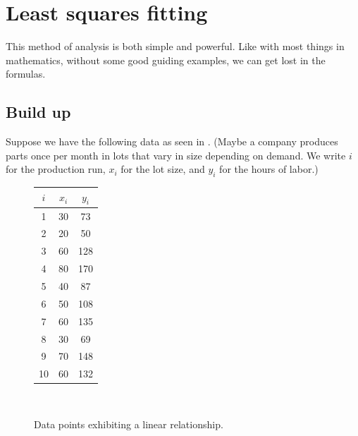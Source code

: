 \documentclass[a4paper, 12pt]{article}
\numberwithin{equation}{section}
\numberwithin{figure}{section}
\theoremstyle{definition}
\begin{document}
\section{Least squares fitting}

This method of analysis is both simple and powerful. Like with most things in
mathematics, without some good guiding examples, we can get lost in the
formulas.

\subsection{Build up}\label{sec:build-up}

Suppose we have the following data as seen in . (Maybe
a company produces parts once per month in lots that vary in size depending on
demand. We write $i$ for the production run, $x_i$ for the lot size, and $y_i$
for the hours of labor.) 

\begin{figure}[h]
	\centering
	\begin{minipage}{0.33\textwidth}
		\centering
		\begin{tabular}{ccc}
			$i$ & $x_i$ & $y_i$ \\ \hline 
			1 & 30 & 73 \\ 
			2 & 20 & 50 \\
			3 & 60 & 128 \\
			4 & 80 & 170 \\
			5 & 40 & 87 \\
			6 & 50 & 108 \\
			7 & 60 & 135 \\
			8 & 30 & 69 \\
			9 & 70 & 148 \\
			10 & 60 & 132 
		\end{tabular}
	\end{minipage}~%
	\begin{minipage}{0.60\textwidth}
		\centering
	\end{minipage}
	\caption{Data points exhibiting a linear relationship.}
	\label{fig:2d-linear-data}
\end{figure}
\end{document}
